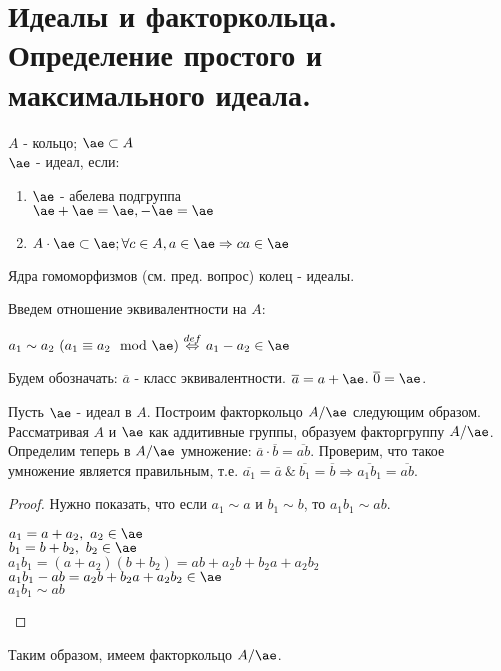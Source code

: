 \section{Идеалы и факторкольца. Определение простого и максимального идеала.}

\begin{defn}
$A$ - кольцо; $\ae \subset A$ \\
$\ae$ - идеал, если:
\begin{enumerate}
 \item $\ae$ - абелева подгруппа\\ $\ae + \ae = \ae, -\ae = \ae$
 \item $A \cdot \ae \subset \ae; \forall c \in A, a \in \ae \Rightarrow ca \in \ae$
\end{enumerate}

\end{defn}

Ядра гомоморфизмов (см. пред. вопрос) колец - идеалы.

Введем отношение эквивалентности на $A$:
\begin{center}
$a_1 \sim a_2 ~ (a_1 \equiv a_2 \mod \ae)~{\buildrel{def}\over{\Leftrightarrow}}~a_1 - a_2 \in \ae$
\end{center}

Будем обозначать: $\overline{a}$ - класс эквивалентности. $\overline{a} = a + \ae$. $\overline{0} = \ae$.

Пусть $\ae$ - идеал в $A$. Построим факторкольцо $A/\ae$ следующим образом. Рассматривая $A$ и $\ae$ как аддитивные группы,
образуем факторгруппу $A/\ae$. Определим теперь в $A/\ae$ умножение: $\overline{a} \cdot \overline{b} = \overline{ab}$.
Проверим, что такое умножение является правильным, т.е. $\overline{a_1} = \overline{a}~\&~\overline{b_1} = \overline{b}
\Rightarrow \overline{a_1b_1} = \overline{ab}$.
\begin{proof}
Нужно показать, что если $a_1 \sim a$ и $b_1 \sim b$, то $a_1b_1 \sim ab$.
\begin{center}
$a_1 = a + a_2, ~a_2 \in \ae$\\
$b_1 = b + b_2, ~b_2 \in \ae$\\

$a_1b_1 = (a + a_2)(b + b_2) = ab + a_2b+b_2a+a_2b_2$\\
$a_1b_1 - ab = a_2b+b_2a+a_2b_2 \in \ae$\\
$a_1b_1 \sim ab$ 
\end{center}
\end{proof}

Таким образом, имеем факторкольцо $A/\ae$.

